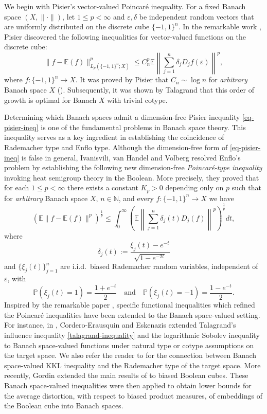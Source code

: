 \documentclass{amsbook}
\theoremstyle{definition}
\theoremstyle{remark}
\numberwithin{section}{chapter}
\numberwithin{equation}{chapter}
\newcommand{\1}{\mathbf{1}}
\begin{document}
We begin with Pisier's vector-valued Poincar\'e inequality. For a fixed Banach space $(X,\|\cdot\|)$, let $1\leq p<\infty$ and $\varepsilon,\delta$ be independent random vectors that are uniformly distributed on the discrete cube $\{-1,1\}^{n}$. In the remarkable work \cite{Pi1986}, Pisier  discovered the following  inequalities for vector-valued functions on the discrete cube:
\begin{equation}\label{eq-pisier-ineq}
\|f-\mathbb{E}(f)\|^{p}_{L_{p}(\{-1,1\}^{n};X)} \le C_n^p \mathbb{E}\left\|\sum_{j=1}^n \delta_j D_j f(\varepsilon)\right\|^{p},
\end{equation}
where $f:\{-1,1\}^{n}\to X$. It was proved by Pisier that $C_n \sim \log n$ for \emph{arbitrary} Banach space $X$ (\cite[Lemma~7.3]{Pi1986}). Subsequently, it was shown by Talagrand \cite{Ta1993} that this order of growth is optimal for Banach $X$ with trivial cotype. 

Determining which Banach spaces admit a dimension-free Pisier inequality \eqref{eq-pisier-ineq} is one of the fundamental problems in Banach space theory. This inequality serves as a key ingredient in establishing the coincidence of Rademacher type and Enflo type. Although the dimension-free form of \eqref{eq-pisier-ineq} is false in general, Ivanisvili, van Handel and Volberg \cite{IvHV2020} resolved Enflo's problem by establishing the following new dimension-free \emph{Poincar\'e-type inequality} invoking heat semigroup theory in the Boolean. More precisely, they proved that for each $1\leq p<\infty$ there exists a constant $K_{p}>0$ depending only on $p$ such that for \emph{arbitrary} Banach space $X$, $n\in\mathbb{N}$, and every $f:\{-1,1\}^{n}\to X$ we have
\begin{equation}
\left(\mathbb{E}\|f- \mathbb{E}(f)\|^p\right)^{\frac{1}{p}} \le \int_0^\infty \left(\mathbb{E}\left\|\sum_{j=1}^n \delta_j(t)D_{j}(f)\right\|^p\right)^{\frac{1}{p}} dt,
\end{equation}
where
\[
\delta_j(t) := \frac{\xi_j(t) - e^{-t}}{\sqrt{1 - e^{-2t}}}
\]
and $\{\xi_j(t)\}_{j=1}^n$ are i.i.d.\ biased Rademacher random variables, independent of $\varepsilon$, with
\[
\mathbb{P}(\xi_j(t) = 1) = \frac{1 + e^{-t}}{2} \quad \text{and} \quad \mathbb{P}(\xi_j(t) = -1) = \frac{1 - e^{-t}}{2}.
\]
Inspired by the remarkable paper \cite{IvHV2020}, specific functional inequalities which refined the Poincar\'e inequalities have been extended to the Banach space-valued setting. For instance, in \cite{CE2023, CE2024}, Cordero-Erausquin and Eskenazis extended Talagrand's influence inequality \eqref{talagrand-inequality} and the logarithmic Sobolev inequality to Banach space-valued functions under natural type or cotype assumptions on the target space. We also refer the reader to \cite{IS2024} for the connection between Banach space-valued KKL inequality and the Rademacher type of the target space. More recently, Gordin \cite{Go2026} extended the main results of \cite{IvHV2020} to biased Boolean cubes. These Banach space-valued inequalities were then applied to obtain lower bounds for the average distortion, with respect to biased product measures, of embeddings of the Boolean cube into Banach spaces.
\end{document}

